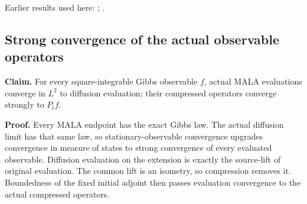 \documentclass[11pt,a4paper]{report}
\begin{document}
Earlier results used here: \cite[Section~3.34.22]{LangevinLean2026ULASC}; \cite[Section~3.34.23]{LangevinLean2026ULASC}.
\subsection{\texorpdfstring{Strong convergence of the actual observable operators}{Strong convergence of the actual observable operators}}
\label{report-step-WassersteinMixing-SemigroupApproximation-lean-3}


\textbf{Claim.} For every square-integrable Gibbs observable \(f\), actual MALA evaluations converge in \(L^2\) to diffusion evaluation; their compressed operators converge strongly to \(P_tf\).



\textbf{Proof.} Every MALA endpoint has the exact Gibbs law. The actual diffusion limit has that same law, so stationary-observable convergence upgrades convergence in measure of states to strong convergence of every evaluated observable. Diffusion evaluation on the extension is exactly the source-lift of original evaluation. The common lift is an isometry, so compression removes it. Boundedness of the fixed initial adjoint then passes evaluation convergence to the actual compressed operators.
\end{document}
